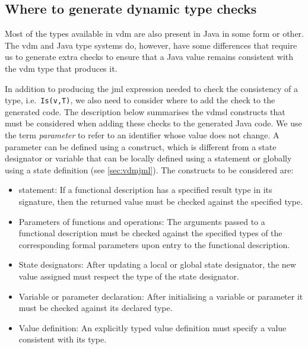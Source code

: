\subsection{Where to generate dynamic type checks}
\label{sec:where}

Most of the types available in \ac{vdm} are also present in Java in
some form or other. The \ac{vdm} and Java type systems do, however,
have some differences that require us to generate extra checks to
ensure that a Java value remains consistent with the \ac{vdm} type
that produces it.


In addition to producing the \ac{jml} expression needed to check the
consistency of a type, i.e.\ \texttt{Is(v,T)}, we also need to
consider where to add the check to the generated code. The description
below summarises the \ac{vdmsl} constructs that must be considered
when adding these checks to the generated Java code. We use the term
\emph{parameter} to refer to an identifier whose value does not
change. A parameter can be defined using a  construct, which
is different from a state designator or variable that can be locally
defined using a  statement or globally using a state
definition (see \autoref{sec:vdmjml}). The constructs to be considered
are:

\begin{itemize}

\item {} statement: If a functional description has a
  specified result type in its signature, then the returned value must
  be checked against the specified type.

\item Parameters of functions and operations: The arguments passed to
  a functional description must be checked against the specified types
  of the corresponding formal parameters upon entry to the functional
  description.

\item State designators: After updating a local or global state
  designator, the new value assigned must respect the type of the
  state designator.

\item Variable or parameter declaration: After initialising a variable
  or parameter it must be checked against its declared type.

\item Value definition: An explicitly typed value definition must
  specify a value consistent with its type.

\end{itemize}

